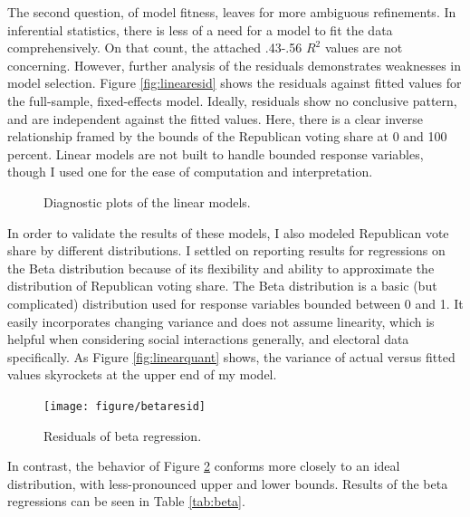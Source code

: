 \documentclass[12pt,oneside]{psthesis}
\begin{document}
The second question, of model fitness, leaves for more ambiguous refinements.
In inferential statistics, there is less of a need for a model to fit the data comprehensively.
On that count, the attached .43-.56 \(R^{2}\) values are not concerning.
However, further analysis of the residuals demonstrates weaknesses in model selection.
Figure \ref{fig:linearesid} shows the residuals against fitted values for the full-sample, fixed-effects model.
Ideally, residuals show no conclusive pattern, and are independent against the fitted values.
Here, there is a clear inverse relationship framed by the bounds of the Republican voting share at 0 and 100 percent.
Linear models are not built to handle bounded response variables, though I used one for the ease of computation and interpretation.
\begin{figure}

{\centering {}

}

\caption{Diagnostic plots of the linear models.}\label{fig:linear}
\end{figure}
In order to validate the results of these models, I also modeled Republican vote share by different distributions.
I settled on reporting results for regressions on the Beta distribution because of its flexibility and ability to approximate the distribution of Republican voting share.
The Beta distribution is a basic (but complicated) distribution used for response variables bounded between 0 and 1.
It easily incorporates changing variance and does not assume linearity, which is helpful when considering social interactions generally, and electoral data specifically.
As Figure \ref{fig:linearquant} shows, the variance of actual versus fitted values skyrockets at the upper end of my model.
\begin{figure}

{\centering \texttt{[image: figure/betaresid]} 

}

\caption{Residuals of beta regression.}\label{fig:betaresid}
\end{figure}
In contrast, the behavior of Figure \ref{fig:betaresid} conforms more closely to an ideal distribution, with less-pronounced upper and lower bounds.
Results of the beta regressions can be seen in Table \ref{tab:beta}.
\end{document}
